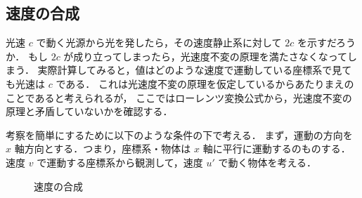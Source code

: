 \subsection{速度の合成}

    光速 $c$ で動く光源から光を発したら，その速度静止系に対して $2c$ を示すだろうか．
    もし $2c$ が成り立ってしまったら，光速度不変の原理を満たさなくなってしまう．
    実際計算してみると，値はどのような速度で運動している座標系で見ても光速は $c$ である．
    これは光速度不変の原理を仮定しているからあたりまえのことであると考えられるが，
    ここではローレンツ変換公式から，光速度不変の原理と矛盾していないかを確認する．


    考察を簡単にするために以下のような条件の下で考える．
    まず，運動の方向を $x$ 軸方向とする．つまり，座標系・物体は $x$ 軸に平行に運動するのものする．
    速度 $v$ で運動する座標系から観測して，速度 $u'$ で動く物体を考える．
                \begin{figure}[hbt]
                    \begin{center}
                        \caption{速度の合成}
                        \label{fig:RT_sokudo_gousei}
                    \end{center}
                \end{figure}


